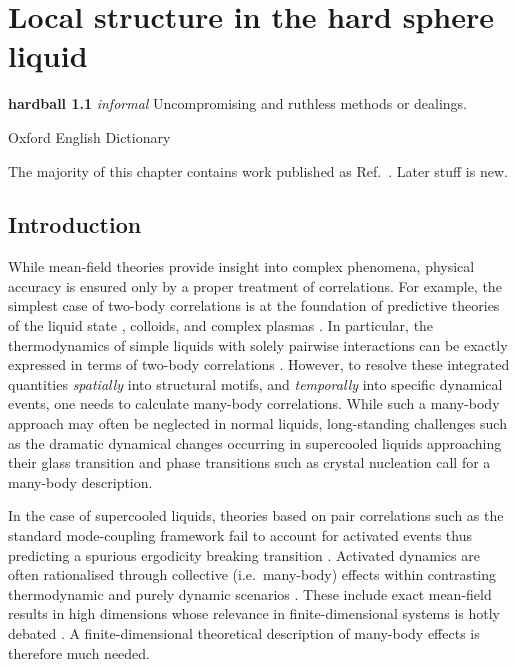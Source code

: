 \documentclass[11pt,twoside]{report}
\begin{document}
\chapter{Local structure in the hard sphere liquid}
\epigraph{\textbf{hardball 1.1} \emph{informal} Uncompromising and ruthless methods or dealings.}{Oxford English Dictionary}
\label{chapter:morphometric-applications}

The majority of this chapter contains work published as Ref.\ \cite{RobinsonPRL2019}.
Later stuff is new.

\section{Introduction}

While mean-field theories provide insight into complex phenomena, physical accuracy is ensured only by a proper treatment of correlations.
For example, the simplest case of two-body correlations is at the foundation of predictive theories of the liquid state \cite{Hansen2013}, colloids, and complex plasmas \cite{LikosPR2001,Ivlev2012}.
In particular, the thermodynamics of simple liquids with solely pairwise interactions can be exactly expressed in terms of two-body correlations \cite{Hansen2013}.
However, to resolve these integrated quantities \emph{spatially} into structural motifs, and \emph{temporally} into specific dynamical events, one needs to calculate many-body correlations.
While such a many-body approach may often be neglected in normal liquids, long-standing challenges such as the dramatic dynamical changes occurring in supercooled liquids approaching their glass transition \cite{BerthierRMP2011,RoyallPR2015} and phase transitions such as crystal nucleation \cite{RussoSR2012} call for a many-body description.

In the case of supercooled liquids, theories based on pair correlations such as the standard mode-coupling framework \cite{goetze} fail to account for activated events thus predicting a spurious ergodicity breaking transition \cite{BrambillaPRL2009,HallettNC2018}.
Activated dynamics are often rationalised through collective (i.e.\ many-body) effects within contrasting thermodynamic and purely dynamic scenarios \cite{LubchenkoARPC2007,TarjusJPCM2005,BiroliPRL2006,JanssenPRL2015,SzamelPTEP2013,ChandlerARPC2010}.
These include exact mean-field results in high dimensions \cite{ParisiRMP2010,CharbonneauARCMP2017} whose relevance in finite-dimensional systems is hotly debated \cite{WyartPRL2017}.
A finite-dimensional theoretical description of many-body effects is therefore much needed.
\end{document}
